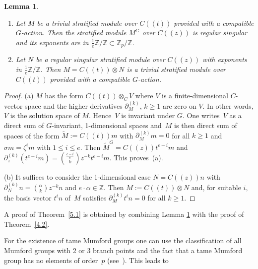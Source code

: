 \documentclass[pdftex]{sigma}
\numberwithin{equation}{section}
\newtheorem{Lemma}[Theorem]{Lemma}
\begin{document}
 \begin{Lemma}\label{5.2}\samepage\quad
\begin{enumerate}\itemsep=0pt
\item[$(a)$] Let $M$ be a trivial stratified module over $C((t))$ provided with a compatible $G$-action. Then the stratified module $M^G$ over $C((z))$ is regular singular and its exponents are in $\frac{1}{e}\mathbb{Z}/\mathbb{Z}\subset \mathbb{Z}_p/\mathbb{Z}$.
\item[$(b)$]Let $N$ be a regular singular stratified module over $C((z))$ with exponents in $\frac{1}{e}\mathbb{Z}/\mathbb{Z}$. Then $M=C((t))\otimes N$ is a trivial stratified module over $C((t))$ provided with a compatible $G$-action.
\end{enumerate}
 \end{Lemma}
\begin{proof} (a) $M$ has the form $C((t))\otimes _CV$ where $V$ is a finite-dimensional $C$-vector space and the higher derivatives $\partial _M^{(k)}$, $k\geq 1$ are zero on $V$. In other words, $V$ is the solution space of $M$. Hence~$V$ is invariant under $G$. One writes~$V$ as a direct sum of $G$-invariant, 1-dimensional spaces and~$M$ is then direct sum of spaces of the form $\tilde{M}:=C((t))m$ with $\partial _M^{(k)}m=0$ for all $k\geq 1$ and $\sigma m=\zeta ^im$ with $1\leq i \leq e$. Then $\tilde{M}^G=C((z))t^{e-i}m$ and $\partial _z^{(k)}(t^{e-i}m)={\frac{e-i}{e}\choose k }z^{-k}t^{e-i}m$. This proves~(a).

(b) It suffices to consider the 1-dimensional case $N=C((z))n$ with $\partial_N^{(k)}n={\alpha \choose k }z^{-k}n$ and $e\cdot \alpha \in \mathbb{Z}$. Then $M:=C((t))\otimes N$ and, for suitable $i$, the basis vector $t^in$ of~$M$ satisfies $\partial_M^{(k)} t^in=0$ for all $k\geq 1$. \end{proof}

A proof of Theorem~\ref{5.1} is obtained by combining Lemma \ref{5.2} with the proof of Theorem~\ref{4.2}.

For the existence of tame Mumford groups one can use the classification of all Mumford groups with 2 or 3 branch points and the fact that a tame Mumford group has no elements of order~$p$ (see~\cite{Vo-vdP}). This leads to
\end{document}
